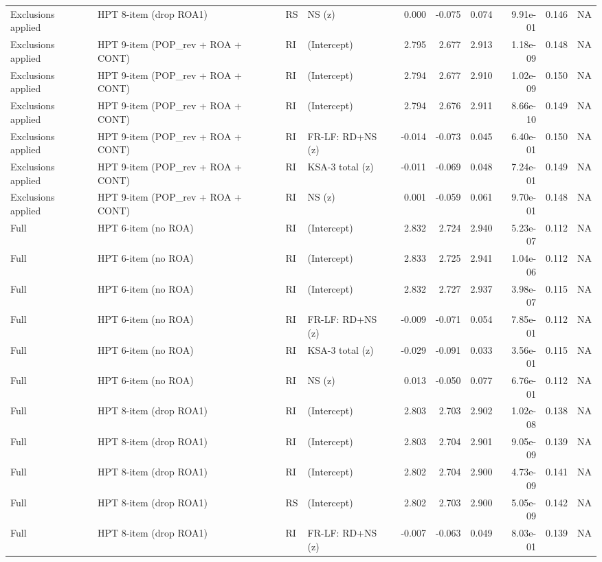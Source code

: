 \documentclass[
  10pt,
]{article}
\begin{document}
\begin{table}[t]
\begin{tabular*}{\linewidth}{@{\extracolsep{\fill}}llllrrrrrr}
Exclusions applied & HPT 8-item (drop ROA1) & RS & NS (z) & 0.000 & -0.075 & 0.074 & 9.91e-01 & 0.146 & NA \\
Exclusions applied & HPT 9-item (POP\_rev + ROA + CONT) & RI & (Intercept) & 2.795 & 2.677 & 2.913 & 1.18e-09 & 0.148 & NA \\
Exclusions applied & HPT 9-item (POP\_rev + ROA + CONT) & RI & (Intercept) & 2.794 & 2.677 & 2.910 & 1.02e-09 & 0.150 & NA \\
Exclusions applied & HPT 9-item (POP\_rev + ROA + CONT) & RI & (Intercept) & 2.794 & 2.676 & 2.911 & 8.66e-10 & 0.149 & NA \\
Exclusions applied & HPT 9-item (POP\_rev + ROA + CONT) & RI & FR-LF: RD+NS (z) & -0.014 & -0.073 & 0.045 & 6.40e-01 & 0.150 & NA \\
Exclusions applied & HPT 9-item (POP\_rev + ROA + CONT) & RI & KSA-3 total (z) & -0.011 & -0.069 & 0.048 & 7.24e-01 & 0.149 & NA \\
Exclusions applied & HPT 9-item (POP\_rev + ROA + CONT) & RI & NS (z) & 0.001 & -0.059 & 0.061 & 9.70e-01 & 0.148 & NA \\
Full & HPT 6-item (no ROA) & RI & (Intercept) & 2.832 & 2.724 & 2.940 & 5.23e-07 & 0.112 & NA \\
Full & HPT 6-item (no ROA) & RI & (Intercept) & 2.833 & 2.725 & 2.941 & 1.04e-06 & 0.112 & NA \\
Full & HPT 6-item (no ROA) & RI & (Intercept) & 2.832 & 2.727 & 2.937 & 3.98e-07 & 0.115 & NA \\
Full & HPT 6-item (no ROA) & RI & FR-LF: RD+NS (z) & -0.009 & -0.071 & 0.054 & 7.85e-01 & 0.112 & NA \\
Full & HPT 6-item (no ROA) & RI & KSA-3 total (z) & -0.029 & -0.091 & 0.033 & 3.56e-01 & 0.115 & NA \\
Full & HPT 6-item (no ROA) & RI & NS (z) & 0.013 & -0.050 & 0.077 & 6.76e-01 & 0.112 & NA \\
Full & HPT 8-item (drop ROA1) & RI & (Intercept) & 2.803 & 2.703 & 2.902 & 1.02e-08 & 0.138 & NA \\
Full & HPT 8-item (drop ROA1) & RI & (Intercept) & 2.803 & 2.704 & 2.901 & 9.05e-09 & 0.139 & NA \\
Full & HPT 8-item (drop ROA1) & RI & (Intercept) & 2.802 & 2.704 & 2.900 & 4.73e-09 & 0.141 & NA \\
Full & HPT 8-item (drop ROA1) & RS & (Intercept) & 2.802 & 2.703 & 2.900 & 5.05e-09 & 0.142 & NA \\
Full & HPT 8-item (drop ROA1) & RI & FR-LF: RD+NS (z) & -0.007 & -0.063 & 0.049 & 8.03e-01 & 0.139 & NA \\

\end{tabular*}
\end{table}
\end{document}
